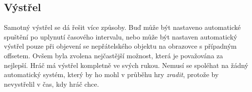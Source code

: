 \subsection{Výstřel}

Samotný výstřel se dá řešit více způsoby. Buď může být nastaveno automatické spuštění po uplynutí časového intervalu, nebo může být nastaven automatický výstřel pouze při objevení se nepřátelského objektu na obrazovce s případným offsetem. Ovšem byla zvolena nejčastější možnost, která je považována za nejlepší. Hráč má výstřel kompletně ve svých rukou. Nemusí se spoléhat na žádný automatický systém, který by ho mohl v průběhu hry \textit{zradit}, protože by nevystřelil v čas, kdy hráč chce.